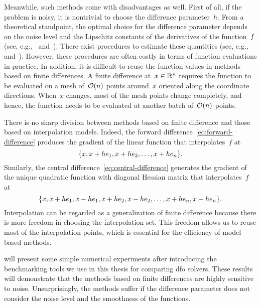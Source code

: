 Meanwhile, such methods come with disadvantages as well.
First of all, if the problem is noisy, it is nontrivial to choose the difference parameter~$h$.
From a theoretical standpoint, the optimal choice for the difference parameter depends on the noise level and the Lipschitz constants of the derivatives of the function~$f$ (see, e.g.,~\cite[\S~8.1]{Nocedal_Wright_2006} and~\cite[Eqs.~(2.13) and~(2.14)]{Shi_Etal_2021}).
There exist procedures to estimate these quantities (see, e.g.,~\cite[\S~3]{More_Wild_2011} and~\cite[Proc.~I]{Shi_Etal_2021}).
However, these procedures are often costly in terms of function evaluations in practice.
In addition, it is difficult to reuse the function values in methods based on finite differences.
A finite difference at~$x \in \mathbb{R}^n$ requires the function to be evaluated on a mesh of~$\operatorname{\mathcal{O}}(n)$ points around~$x$ oriented along the coordinate directions.
When~$x$ changes, most of the mesh points change completely, and hence, the function needs to be evaluated at another batch of~$\operatorname{\mathcal{O}}(n)$ points.

There is no sharp division between methods based on finite difference and those based on interpolation models.
Indeed, the forward difference~\cref{eq:forward-difference} produces the gradient of the linear function that interpolates~$f$ at
\begin{equation*}
    \{x, x + h e_1, x + h e_2, \dots, x + h e_n\}.
\end{equation*}
Similarly, the central difference~\cref{eq:central-difference} generates the gradient of the unique quadratic function with diagonal Hessian matrix that interpolates~$f$ at
\begin{equation*}
    \{x, x + h e_1, x - h e_1, x + h e_2, x - h e_2, \dots, x + h e_n, x - h e_n\}.
\end{equation*}
Interpolation can be regarded as a generalization of finite difference because there is more freedom in choosing the interpolation set.
This freedom allows us to reuse most of the interpolation points, which is essential for the efficiency of model-based methods.

 will present some simple numerical experiments after introducing the benchmarking tools we use in this thesis for comparing \gls{dfo} solvers.
These results will demonstrate that the methods based on finite differences are highly sensitive to noise.
Unsurprisingly, the methods suffer if the difference parameter does not consider the noise level and the smoothness of the functions.


